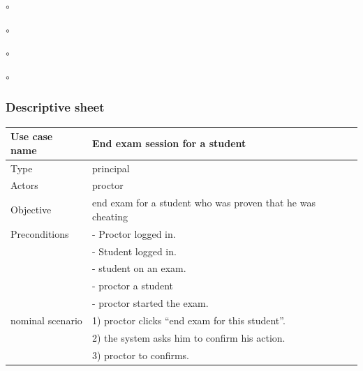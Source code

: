 \documentclass[]{uc2pfecaneva}
\begin{document}
\begin{list}{$\circ$}{}
\begin{list}{$\circ$}{}
\begin{list}{$\circ$}{}
\begin{list}{$\circ$}{}
\begin{table}[h]
        \subsubsection{Descriptive sheet}
        \centering
        \begin{tabularx}{\textwidth}{|l|X|}
            \hline
            Use case name         & End exam session for a student                                                                                                \\ \hline
            Type                  & principal                                                                                                              \\ \hline
            Actors                & proctor                                                                                                                \\ \hline
            Objective             & end exam for a student who was proven that he was cheating                                                             \\ \hline
            Preconditions
            & - Proctor logged in.                                                                                                   \\
            & - Student logged in.                                                                                                   \\
            & - student on an exam.                                                                                                  \\
            & - proctor a student                                                                                                 \\
            & - proctor started the exam.                                                                                            \\ \hline
            nominal scenario
            & 1) proctor clicks “end exam for this student”.                                                                         \\
            & 2) the system asks him to confirm his action.                                                                          \\
            & 3) proctor to confirms.                                                                                                \\

\end{tabularx}
\end{table}
\end{list}
\end{list}
\end{list}
\end{list}
\end{document}
